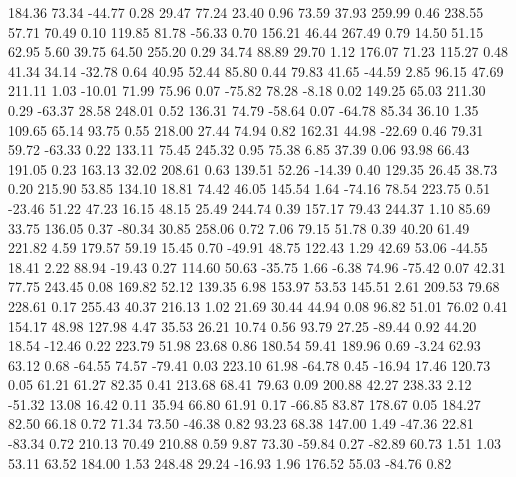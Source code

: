   184.36   73.34  -44.77    0.28
   29.47   77.24   23.40    0.96
   73.59   37.93  259.99    0.46
  238.55   57.71   70.49    0.10
  119.85   81.78  -56.33    0.70
  156.21   46.44  267.49    0.79
   14.50   51.15   62.95    5.60
   39.75   64.50  255.20    0.29
   34.74   88.89   29.70    1.12
  176.07   71.23  115.27    0.48
   41.34   34.14  -32.78    0.64
   40.95   52.44   85.80    0.44
   79.83   41.65  -44.59    2.85
   96.15   47.69  211.11    1.03
  -10.01   71.99   75.96    0.07
  -75.82   78.28   -8.18    0.02
  149.25   65.03  211.30    0.29
  -63.37   28.58  248.01    0.52
  136.31   74.79  -58.64    0.07
  -64.78   85.34   36.10    1.35
  109.65   65.14   93.75    0.55
  218.00   27.44   74.94    0.82
  162.31   44.98  -22.69    0.46
   79.31   59.72  -63.33    0.22
  133.11   75.45  245.32    0.95
   75.38    6.85   37.39    0.06
   93.98   66.43  191.05    0.23
  163.13   32.02  208.61    0.63
  139.51   52.26  -14.39    0.40
  129.35   26.45   38.73    0.20
  215.90   53.85  134.10   18.81
   74.42   46.05  145.54    1.64
  -74.16   78.54  223.75    0.51
  -23.46   51.22   47.23   16.15
   48.15   25.49  244.74    0.39
  157.17   79.43  244.37    1.10
   85.69   33.75  136.05    0.37
  -80.34   30.85  258.06    0.72
    7.06   79.15   51.78    0.39
   40.20   61.49  221.82    4.59
  179.57   59.19   15.45    0.70
  -49.91   48.75  122.43    1.29
   42.69   53.06  -44.55   18.41
    2.22   88.94  -19.43    0.27
  114.60   50.63  -35.75    1.66
   -6.38   74.96  -75.42    0.07
   42.31   77.75  243.45    0.08
  169.82   52.12  139.35    6.98
  153.97   53.53  145.51    2.61
  209.53   79.68  228.61    0.17
  255.43   40.37  216.13    1.02
   21.69   30.44   44.94    0.08
   96.82   51.01   76.02    0.41
  154.17   48.98  127.98    4.47
   35.53   26.21   10.74    0.56
   93.79   27.25  -89.44    0.92
   44.20   18.54  -12.46    0.22
  223.79   51.98   23.68    0.86
  180.54   59.41  189.96    0.69
   -3.24   62.93   63.12    0.68
  -64.55   74.57  -79.41    0.03
  223.10   61.98  -64.78    0.45
  -16.94   17.46  120.73    0.05
   61.21   61.27   82.35    0.41
  213.68   68.41   79.63    0.09
  200.88   42.27  238.33    2.12
  -51.32   13.08   16.42    0.11
   35.94   66.80   61.91    0.17
  -66.85   83.87  178.67    0.05
  184.27   82.50   66.18    0.72
   71.34   73.50  -46.38    0.82
   93.23   68.38  147.00    1.49
  -47.36   22.81  -83.34    0.72
  210.13   70.49  210.88    0.59
    9.87   73.30  -59.84    0.27
  -82.89   60.73    1.51    1.03
   53.11   63.52  184.00    1.53
  248.48   29.24  -16.93    1.96
  176.52   55.03  -84.76    0.82
